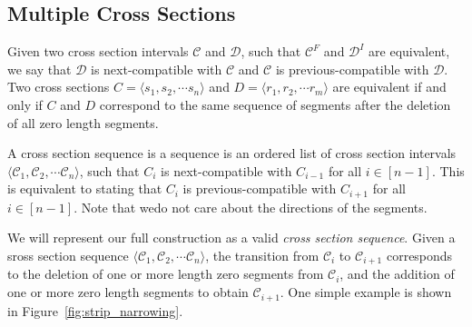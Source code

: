 \subsection{Multiple Cross Sections}
\label{sec:intervals}


\begin{definition}
\label{def:compatible}
Given two cross section intervals $\mathcal C$ and $\mathcal D$, such that $\mathcal C^F$ and $\mathcal D^I$ are equivalent,
we say that $\mathcal D$ is next-compatible with $\mathcal C$ and $\mathcal C$ is previous-compatible with $\mathcal D$.
Two cross sections $C = \langle s_1, s_2,\cdots s_n \rangle$ and $D = \langle r_1, r_2,\cdots r_m \rangle$ are equivalent
if and only if $C$ and $D$ correspond to the same sequence of segments after the deletion of all zero length segments.
\end{definition}

\begin{definition}
\label{def:cross_section_sequence}
A cross section sequence is a sequence is an ordered list of cross section intervals $ \langle \mathcal C_1, \mathcal C_2,\cdots \mathcal C_n \rangle$,
such that $C_{i}$ is next-compatible with $C_{i-1}$ for all $i\in [n-1]$.
This is equivalent to stating that $C_{i}$ is previous-compatible with $C_{i+1}$ for all $i\in [n-1]$.
Note that wedo not care about the directions of the segments.
\end{definition}

We will represent our full construction as a valid \emph{cross section sequence}.
Given a sross section sequence $\langle \mathcal C_1, \mathcal C_2,\cdots \mathcal C_n \rangle$,
the transition from $\mathcal C_i$ to $\mathcal C_{i+1}$ corresponds to the deletion of one or more
length zero segments from $\mathcal C_i$, and the addition of one or more zero length segments to obtain $\mathcal C_{i+1}$.
One simple example is shown in Figure~\ref{fig:strip_narrowing}.

